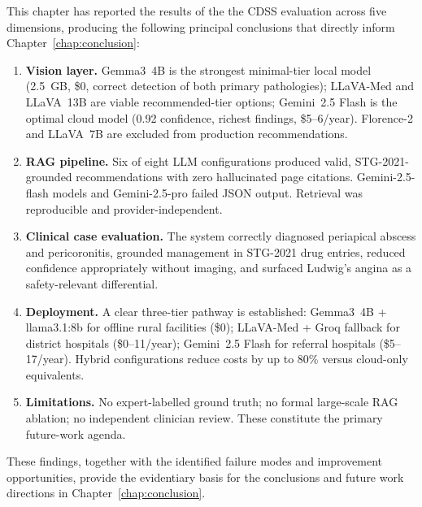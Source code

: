 \documentclass[12pt,a4paper]{report}
\begin{document}
	This chapter has reported the results of the the CDSS evaluation across five
	dimensions, producing the following principal conclusions that directly inform
	Chapter~\ref{chap:conclusion}:
	
	\begin{enumerate}
		
		\item \textbf{Vision layer.} Gemma3~4B is the strongest minimal-tier local model
		(2.5~GB, \$0, correct detection of both primary pathologies); LLaVA-Med and
		LLaVA~13B are viable recommended-tier options; Gemini~2.5 Flash is the optimal
		cloud model (0.92 confidence, richest findings, \$5--6/year). Florence-2 and
		LLaVA~7B are excluded from production recommendations.
		
		\item \textbf{RAG pipeline.} Six of eight LLM configurations produced valid,
		STG-2021-grounded recommendations with zero hallucinated page citations.
		Gemini-2.5-flash models and Gemini-2.5-pro failed JSON output. Retrieval was reproducible and provider-independent.
		
		\item \textbf{Clinical case evaluation.} The system correctly diagnosed
		periapical abscess and pericoronitis, grounded management in STG-2021 drug
		entries, reduced confidence appropriately without imaging, and surfaced
		Ludwig's angina as a safety-relevant differential.
		
		\item \textbf{Deployment.} A clear three-tier pathway is established:
		Gemma3~4B + llama3.1:8b for offline rural facilities (\$0);
		LLaVA-Med + Groq fallback for district hospitals (\$0--11/year);
		Gemini~2.5 Flash for referral hospitals (\$5--17/year). Hybrid configurations
		reduce costs by up to 80\% versus cloud-only equivalents.
		
		\item \textbf{Limitations.} No expert-labelled ground truth;
		no formal large-scale RAG ablation; no independent clinician review. These
		constitute the primary future-work agenda.
		
	\end{enumerate}
	
	These findings, together with the identified failure modes and improvement
	opportunities, provide the evidentiary basis for the conclusions and future
	work directions in Chapter~\ref{chap:conclusion}.
	
	
\end{document}
